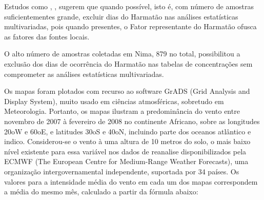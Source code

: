 Estudos como \citet{aboh2009}, \citet{ofosu2013}, \citet{ofosu2012} sugerem que
quando possível, isto é, com número de amostras suficientementes grande, excluir
dias do Harmatão nas análises estatísticas multivariadas, pois quando 
presentes, o Fator representante do Harmatão ofusca as fatores das fontes
locais.

O alto número de amostras coletadas em Nima, 879 no total, possibilitou a 
exclusão dos dias de ocorrência do Harmatão nas tabelas de concentrações 
sem comprometer as análises estatísticas multivariadas. 

Os mapas foram plotados com recurso ao software GrADS (Grid Analysis and Display System), muito usado em ciências atmosféricas, sobretudo em Meteorologia. Portanto, os mapas ilustram a predominância do vento entre novembro de 2007 à fevereiro de 2008 no continente Africano, sobre as longitudes 20oW e 60oE, e latitudes 30oS e 40oN, incluindo parte dos oceanos atlântico e indico. Considerou-se o vento à uma altura de 10 metros do solo, o mais baixo nível existente para essa variável nos dados de reanalise disponibilizados pela ECMWF (The European Centre for Medium-Range Weather Forecasts), uma organização intergovernamental independente, suportada por 34 países.
Os valores para a intensidade média do vento em cada um dos mapas correspondem a média do mesmo mês, calculado a partir da fórmula abaixo:

